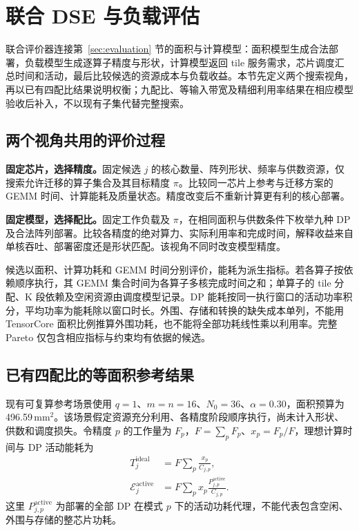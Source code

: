 \section{联合 DSE 与负载评估}
\label{sec:workload}

联合评价器连接第~\ref{sec:evaluation} 节的面积与计算模型：面积模型生成合法部署，负载模型生成逐算子精度与形状，计算模型返回 tile 服务需求，芯片调度汇总时间和活动，最后比较候选的资源成本与负载收益。本节先定义两个搜索视角，再以已有四配比结果说明权衡；九配比、等输入带宽及精细利用率结果在相应模型验收后补入，不以现有子集代替完整搜索。

\subsection{两个视角共用的评价过程}
\label{sec:joint_dse}

\textbf{固定芯片，选择精度。}固定候选 $j$ 的核心数量、阵列形状、频率与供数资源，仅搜索允许迁移的算子集合及其目标精度 $\pi$。比较同一芯片上参考与迁移方案的 GEMM 时间、计算能耗及质量状态。精度改变后不重新计算更有利的核心部署。

\textbf{固定模型，选择配比。}固定工作负载及 $\pi$，在相同面积与供数条件下枚举九种 DP 及合法阵列部署。比较各精度的绝对算力、实际利用率和完成时间，解释收益来自单核吞吐、部署密度还是形状匹配。该视角不同时改变模型精度。

候选以面积、计算功耗和 GEMM 时间分别评价，能耗为派生指标。若各算子按依赖顺序执行，其 GEMM 集合时间为各算子多核完成时间之和；单算子的 tile 分配、K 段依赖及空闲资源由调度模型记录。DP 能耗按同一执行窗口的活动功率积分，平均功率为能耗除以窗口时长。外围、存储和转换的缺失成本单列，不能用 TensorCore 面积比例推算外围功耗，也不能将全部功耗线性乘以利用率。完整 Pareto 仅包含相应指标与约束均有依据的候选。

\subsection{已有四配比的等面积参考结果}
\label{sec:k4_simplex}

现有可复算参考场景使用 $q=1$、$m=n=16$、$N_0=36$、$\alpha=0.30$，面积预算为 496.59\,mm$^2$。该场景假定资源充分利用、各精度阶段顺序执行，尚未计入形状、供数和调度损失。令精度 $p$ 的工作量为 $F_p$，$F=\sum_pF_p$、$x_p=F_p/F$，理想计算时间与 DP 活动能耗为
\begin{align}
T_j^{\mathrm{ideal}}&=F\sum_p\frac{x_p}{C_{j,p}},
\label{eq:k4_time}\\
\mathcal E_j^{\mathrm{active}}&=F\sum_p x_p\frac{P_{j,p}^{\mathrm{active}}}{C_{j,p}}.
\label{eq:k4_energy}
\end{align}
这里 $P_{j,p}^{\mathrm{active}}$ 为部署的全部 DP 在模式 $p$ 下的活动功耗代理，不能代表包含空闲、外围与存储的整芯片功耗。

